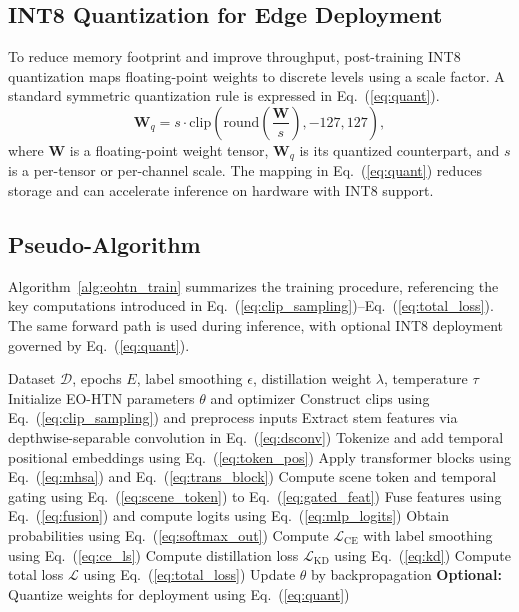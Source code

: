 \documentclass[AMA,Times1COL]{WileyNJDv5} %
\begin{document}
\subsection{INT8 Quantization for Edge Deployment}
To reduce memory footprint and improve throughput, post-training INT8 quantization maps floating-point weights to discrete levels using a scale factor. A standard symmetric quantization rule is expressed in Eq.~(\ref{eq:quant}).
\begin{equation}
\mathbf{W}_q = s\cdot \mathrm{clip}\!\left(\mathrm{round}\!\left(\frac{\mathbf{W}}{s}\right), -127, 127\right),
\label{eq:quant}
\end{equation}
where $\mathbf{W}$ is a floating-point weight tensor, $\mathbf{W}_q$ is its quantized counterpart, and $s$ is a per-tensor or per-channel scale. The mapping in Eq.~(\ref{eq:quant}) reduces storage and can accelerate inference on hardware with INT8 support.

\subsection{Pseudo-Algorithm}
Algorithm~\ref{alg:eohtn_train} summarizes the training procedure, referencing the key computations introduced in Eq.~(\ref{eq:clip_sampling})--Eq.~(\ref{eq:total_loss}). The same forward path is used during inference, with optional INT8 deployment governed by Eq.~(\ref{eq:quant}).

\begin{algorithm}[t]
\caption{Training procedure for EO-HTN}
\label{alg:eohtn_train}
\begin{algorithmic}[1]
\Require Dataset $\mathcal{D}$, epochs $E$, label smoothing $\epsilon$, distillation weight $\lambda$, temperature $\tau$
\State Initialize EO-HTN parameters $\theta$ and optimizer
    \State Construct clips using Eq.~(\ref{eq:clip_sampling}) and preprocess inputs
    \State Extract stem features via depthwise-separable convolution in Eq.~(\ref{eq:dsconv})
    \State Tokenize and add temporal positional embeddings using Eq.~(\ref{eq:token_pos})
    \State Apply transformer blocks using Eq.~(\ref{eq:mhsa}) and Eq.~(\ref{eq:trans_block})
    \State Compute scene token and temporal gating using Eq.~(\ref{eq:scene_token}) to Eq.~(\ref{eq:gated_feat})
    \State Fuse features using Eq.~(\ref{eq:fusion}) and compute logits using Eq.~(\ref{eq:mlp_logits})
    \State Obtain probabilities using Eq.~(\ref{eq:softmax_out})
    \State Compute $\mathcal{L}_{\mathrm{CE}}$ with label smoothing using Eq.~(\ref{eq:ce_ls})
    \State Compute distillation loss $\mathcal{L}_{\mathrm{KD}}$ using Eq.~(\ref{eq:kd})
    \State Compute total loss $\mathcal{L}$ using Eq.~(\ref{eq:total_loss})
    \State Update $\theta$ by backpropagation
  \EndFor
\EndFor
\Statex \textbf{Optional:} Quantize weights for deployment using Eq.~(\ref{eq:quant})
\end{algorithmic}
\end{algorithm}
\end{document}
